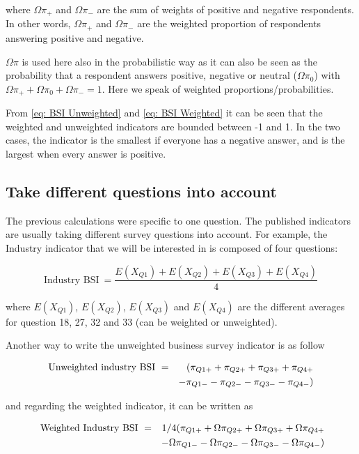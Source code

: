 \documentclass[12pt,a4paper,oneside]{book}
\begin{document}
where $\Omega \pi_+$ and $\Omega \pi_-$ are the sum of weights of positive and negative respondents. 
In other words, $\Omega \pi_+$ and $\Omega \pi_-$ are the weighted proportion of respondents answering positive and negative. 

$\Omega \pi$ is used here also in the probabilistic way as it can also be seen as the probability that a respondent answers positive, negative or neutral ($\Omega \pi_0$) with $\Omega \pi_+ + \Omega \pi_0 + \Omega \pi_- =1$. Here we speak of weighted proportions/probabilities.

From \autoref{eq: BSI Unweighted} and \autoref{eq: BSI Weighted} it can be seen that the weighted and unweighted indicators are bounded between -1 and 1. In the two cases, the indicator is the smallest if everyone has a negative answer, and is the largest when every answer is positive.

\subsection{Take different questions into account}

The previous calculations were specific to one question. The published indicators are usually taking different survey questions into account. For example, the Industry indicator that we will be interested in is composed of four questions:

\begin{equation}
    \mbox{Industry BSI}\ = \frac{E(X_{Q1}) + E(X_{Q2}) + E(X_{Q3}) + E(X_{Q4})}{4}
\end{equation}

where 
$E(X_{Q1})$, $E(X_{Q2})$, $E(X_{Q3})$ and $E(X_{Q4})$ are the different averages for question 18, 27, 32 and 33 (can be weighted or unweighted).

Another way to write the unweighted business survey indicator is as follow

\begin{eqnarray}
    \mbox{Unweighted industry BSI}\ &=& \Large( \pi_{Q1+} + \pi_{Q2+} + \pi_{Q3+} + \pi_{Q4+} \nonumber \\
    && - \pi_{Q1-} - \pi_{Q2-} - \pi_{Q3-} - \pi_{Q4-} \Large)
\end{eqnarray}

and regarding the weighted indicator, it can be written as

\begin{eqnarray}
    \mbox{ Weighted Industry BSI}\ &=& 1/4 ( \pi_{Q1+} + \Omega \pi_{Q2+} + \Omega \pi_{Q3+} + \Omega \pi_{Q4+} \nonumber \\
    && - \Omega \pi_{Q1-} - \Omega \pi_{Q2-} - \Omega \pi_{Q3-} - \Omega \pi_{Q4-} \Large) 
\end{eqnarray}
\end{document}

